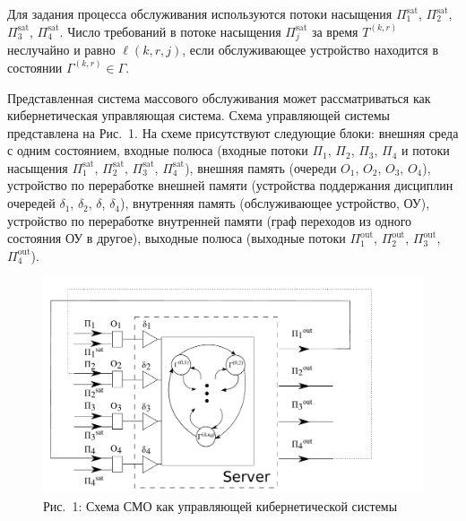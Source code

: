 \begin{ptkarticle}[russian]
Для задания процесса обслуживания используются потоки насыщения
$\Pi^{\mathrm{sat}}_1$, $\Pi^{\mathrm{sat}}_2$, $\Pi^{\mathrm{sat}}_3$,
$\Pi^{\mathrm{sat}}_4$.  Число требований в потоке насыщения
$\Pi^{\mathrm{\text{sat}}}_j$ за время $T^{(k,r)}$ неслучайно и равно $\ell(k,r,j)$, если
обслуживающее устройство находится в состоянии $\Gamma^{(k,r)}\in \Gamma$.

Представленная система массового обслуживания может рассматриваться как
кибернетическая управляющая система.  Схема управляющей системы
представлена на Рис.~1. На схеме присутствуют следующие блоки: внешняя среда с
одним состоянием, входные полюса (входные потоки $\Pi_1$, $\Pi_2$, $\Pi_3$,
$\Pi_4$ и потоки насыщения $\Pi^{\mathrm{sat}}_1$, $\Pi^{\mathrm{sat}}_2$, $\Pi^{\mathrm{sat}}_3$,
$\Pi^{\mathrm{sat}}_4$), внешняя память (очереди $O_1$, $O_2$, $O_3$, $O_4$), устройство по
переработке внешней памяти (устройства поддержания дисциплин очередей
$\delta_1$, $\delta_2$, $\delta$, $\delta_4$), внутренняя память (обслуживающее
устройство, ОУ), устройство по переработке внутренней памяти (граф переходов из
одного состояния ОУ в другое), выходные полюса (выходные потоки
$\Pi^{\mathrm{\text{out}}}_1$, $\Pi^{\mathrm{\text{out}}}_2$,
$\Pi^{\mathrm{\text{out}}}_3$, $\Pi^{\mathrm{\text{out}}}_4$).
\sloppy 

\begin{figure}[h!]
   \centering
    \includegraphics[width=13cm]{SystemScheme.pdf}
    \caption {Рис.~1: Схема СМО как управляющей кибернетической системы}
\end{figure}


\end{ptkarticle}
